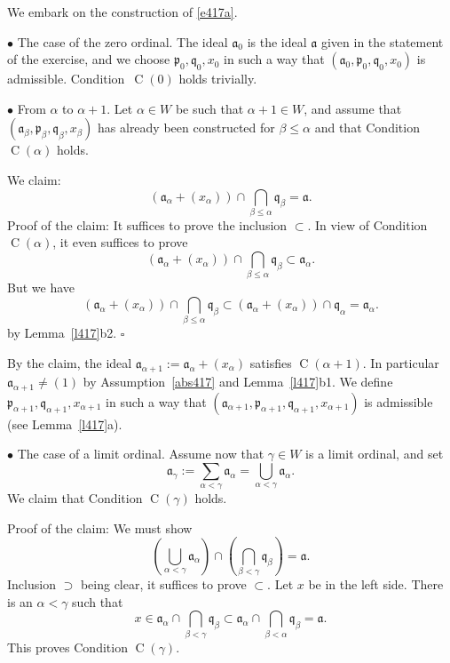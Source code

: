 \documentclass[parskip=half,fontsize=12pt]{scrartcl}%
\newcommand{\oo}{\operatorname}\newcommand{\ooo}{\operatorname*}
\newcommand{\mf}{\mathfrak}
\newcommand{\aaa}{\mf a}
\newcommand{\ppp}{\mf p}
\newcommand{\qqq}{\mf q}
\newcommand{\bu}{\bullet}
\begin{document}
We embark on the construction of \eqref{e417a}.

$\bu$ The case of the zero ordinal. The ideal $\aaa_0$ is the ideal $\aaa$ given in the statement of the exercise, and we choose $\ppp_0,\qqq_0,x_0$ in such a way that $(\aaa_0,\ppp_0,\qqq_0,x_0)$ is admissible. Condition~$\oo C(0)$ holds trivially.

$\bu$ From $\alpha$ to $\alpha+1$. Let $\alpha\in W$ be such that $\alpha+1\in W$, and assume that $(\aaa_\beta,\ppp_\beta,\qqq_\beta,x_\beta)$ has already been constructed for $\beta\le\alpha$ and that Condition $\oo C(\alpha)$ holds. 

We claim: 
$$
(\aaa_\alpha+(x_\alpha))\cap\bigcap_{\beta\le\alpha}\qqq_\beta=\aaa.
$$ 
Proof of the claim: It suffices to prove the inclusion $\subset$. In view of Condition $\oo C(\alpha)$, it even suffices to prove 
$$
(\aaa_\alpha+(x_\alpha))\cap\bigcap_{\beta\le\alpha}\qqq_\beta\subset\aaa_\alpha.
$$ 
But we have 
$$
(\aaa_\alpha+(x_\alpha))\cap\bigcap_{\beta\le\alpha}\qqq_\beta\subset(\aaa_\alpha+(x_\alpha))\cap\qqq_\alpha=\aaa_\alpha.
$$ 
by Lemma~\ref{l417}b2. $\square$

By the claim, the ideal $\aaa_{\alpha+1}:=\aaa_\alpha+(x_\alpha)$ satisfies $\oo C(\alpha+1)$. In particular $\aaa_{\alpha+1}\ne(1)$ by Assumption~\eqref{abs417} and Lemma~\ref{l417}b1. We define $\ppp_{\alpha+1},\qqq_{\alpha+1},x_{\alpha+1}$ in such a way that $(\aaa_{\alpha+1},\ppp_{\alpha+1},\qqq_{\alpha+1},x_{\alpha+1})$ is admissible (see Lemma~\ref{l417}a).


$\bu$ The case of a limit ordinal. Assume now that $\gamma\in W$ is a limit ordinal, and set 
$$
\aaa_\gamma:=\sum_{\alpha<\gamma}\aaa_\alpha=\bigcup_{\alpha<\gamma}\aaa_\alpha.
$$ 
We claim that Condition $\oo C(\gamma)$ holds.

Proof of the claim: We must show 
$$
\left(\bigcup_{\alpha<\gamma}\aaa_\alpha\right)\cap\left(\bigcap_{\beta<\gamma}\qqq_\beta\right)=\aaa.
$$ 
Inclusion $\supset$ being clear, it suffices to prove $\subset$. Let $x$ be in the left side. There is an $\alpha<\gamma$ such that 
$$
x\in\aaa_\alpha\cap\bigcap_{\beta<\gamma}\qqq_\beta\subset\aaa_\alpha\cap\bigcap_{\beta<\alpha}\qqq_\beta=\aaa.
$$ 
This proves Condition $\oo C(\gamma)$. 
\end{document}
